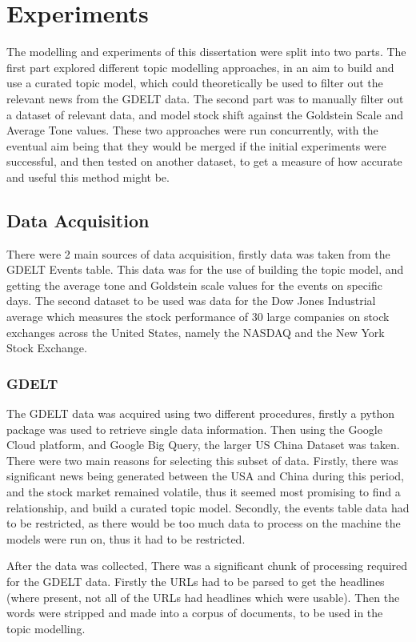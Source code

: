 \section{Experiments}

The modelling and experiments of this dissertation were split into two parts. The first part explored different topic modelling approaches, in an aim to build and use a curated topic model, which could theoretically be used to filter out the relevant news from the GDELT data. The second part was to manually filter out a dataset of relevant data, and model stock shift against the Goldstein Scale and Average Tone values. These two approaches were run concurrently, with the eventual aim being that they would be merged if the initial experiments were successful, and then tested on another dataset, to get a measure of how accurate and useful this method might be. 

\subsection{Data Acquisition}
There were 2 main sources of data acquisition, firstly data was taken from the GDELT Events table. This data was for the use of building the topic model, and getting the average tone and Goldstein scale values for the events on specific days. The second dataset to be used was data for the Dow Jones Industrial average which measures the stock performance of 30 large companies on stock exchanges across the United States, namely the NASDAQ and the New York Stock Exchange.

\subsubsection{GDELT}
The GDELT data was acquired using two different procedures, firstly a python package was used to retrieve single data information. Then using the Google Cloud platform, and Google Big Query, the larger US China Dataset was taken. There were two main reasons for selecting this subset of data. Firstly, there was significant news being generated between the USA and China during this period, and the stock market remained volatile, thus it seemed most promising to find a relationship, and build a curated topic model. Secondly, the events table data had to be restricted, as there would be too much data to process on the machine the models were run on, thus it had to be restricted.

After the data was collected, There was a significant chunk of processing required for the GDELT data. Firstly the URLs had to be parsed to get the headlines (where present, not all of the URLs had headlines which were usable). Then the words were stripped and made into a corpus of documents, to be used in the topic modelling. 

